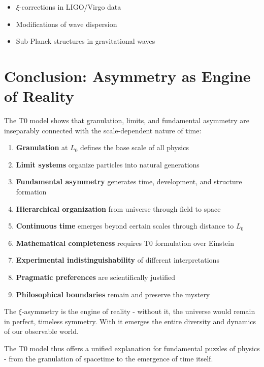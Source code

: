 \documentclass[12pt,a4paper]{article}
\newcommand{\xipar}{\xi}
\newcommand{\Lzero}{L_0}
\theoremstyle{definition}
\theoremstyle{remark}
\begin{document}
	\begin{itemize}
		\item $\xipar$-corrections in LIGO/Virgo data
		\item Modifications of wave dispersion
		\item Sub-Planck structures in gravitational waves
	\end{itemize}
	
	\section{Conclusion: Asymmetry as Engine of Reality}
	
	The T0 model shows that granulation, limits, and fundamental asymmetry are inseparably connected with the scale-dependent nature of time:
	
	\begin{enumerate}
		\item \textbf{Granulation} at $\Lzero$ defines the base scale of all physics
		\item \textbf{Limit systems} organize particles into natural generations
		\item \textbf{Fundamental asymmetry} generates time, development, and structure formation
		\item \textbf{Hierarchical organization} from universe through field to space
		\item \textbf{Continuous time} emerges beyond certain scales through distance to $\Lzero$
		\item \textbf{Mathematical completeness} requires T0 formulation over Einstein
		\item \textbf{Experimental indistinguishability} of different interpretations
		\item \textbf{Pragmatic preferences} are scientifically justified
		\item \textbf{Philosophical boundaries} remain and preserve the mystery
	\end{enumerate}
	
	The $\xipar$-asymmetry is the engine of reality - without it, the universe would remain in perfect, timeless symmetry. With it emerges the entire diversity and dynamics of our observable world.
	
	The T0 model thus offers a unified explanation for fundamental puzzles of physics - from the granulation of spacetime to the emergence of time itself.
	
\end{document}
